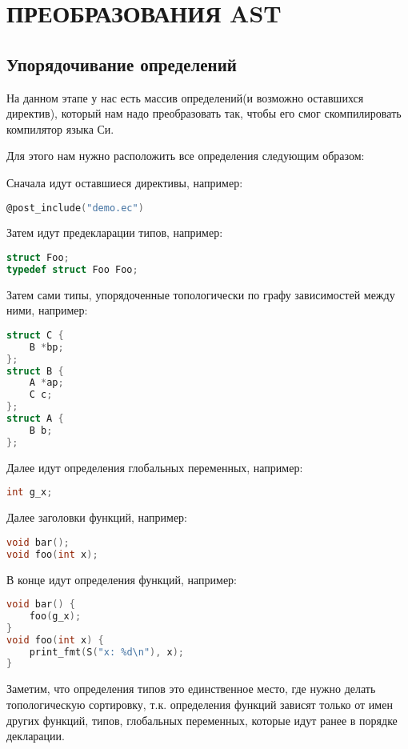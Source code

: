 
\chapter{ПРЕОБРАЗОВАНИЯ AST}
\section{Упорядочивание определений}
\label{pass:ordering}

На данном этапе у нас есть массив определений(и возможно оставшихся директив), 
который нам надо преобразовать так, чтобы его смог скомпилировать компилятор языка Си.

Для этого нам нужно расположить все определения следующим образом:

Сначала идут оставшиеся директивы, например:
\begin{lstlisting}[language=c]
@post_include("demo.ec")    
\end{lstlisting}

Затем идут предекларации типов, например:
\begin{lstlisting}[language=c]
struct Foo;
typedef struct Foo Foo;
\end{lstlisting}

Затем сами типы, упорядоченные топологически по графу зависимостей между ними, например:
\begin{lstlisting}[language=c]
struct C {
    B *bp;
};
struct B {
    A *ap;
    C c;
};
struct A {
    B b;
};
\end{lstlisting}

Далее идут определения глобальных переменных, например:
\begin{lstlisting}[language=c]
int g_x;
\end{lstlisting}

Далее заголовки функций, например:
\begin{lstlisting}[language=c]
void bar();
void foo(int x);
\end{lstlisting}

В конце идут определения функций, например:
\begin{lstlisting}[language=c]
void bar() {
    foo(g_x);
}
void foo(int x) {
    print_fmt(S("x: %d\n"), x);
}
\end{lstlisting}

Заметим, что определения типов это единственное место, где нужно делать топологическую сортировку, 
т.к. определения функций зависят только от имен других функций, типов, глобальных переменных, которые идут ранее в порядке декларации.

